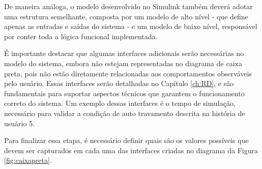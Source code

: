 De maneira análoga, o modelo desenvolvido no Simulink também deverá adotar uma estrutura semelhante, composta por um modelo de alto nível - que define apenas as 
entradas e saídas do sistema - e um modelo de baixo nível, responsável por conter toda a lógica funcional implementada.

É importante destacar que algumas interfaces adicionais serão necessárias no modelo do sistema, embora não estejam representadas no diagrama de caixa preta, 
pois não estão diretamente relacionadas aos comportamentos observáveis pelo usuário. Essas interfaces serão detalhadas no Capítulo \ref{ch:RD}, e são fundamentais para suportar aspectos técnicos que garantem o funcionamento correto do sistema. Um exemplo dessas interfaces é o tempo 
de simulação, necessário para validar a condição de auto travamento descrita na história de usuário 5.

Para finalizar essa etapa, é necessário definir quais são os valores possíveis que devem ser capturados em cada uma das interfaces criadas no diagrama da Figura \ref{fig:caixapreta}.

